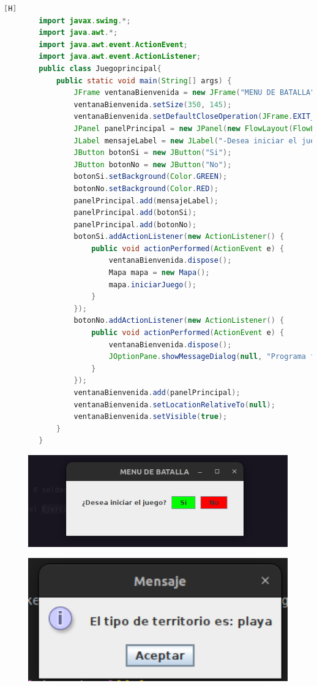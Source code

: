 \documentclass{article}
\begin{document}
	\begin{lstlisting}[language=java,caption={Las lineas de codigos de la clase JuegoPrincipal}][H]
		import javax.swing.*;
		import java.awt.*;
		import java.awt.event.ActionEvent;
		import java.awt.event.ActionListener;
		public class Juegoprincipal{
			public static void main(String[] args) {
				JFrame ventanaBienvenida = new JFrame("MENU DE BATALLA");
				ventanaBienvenida.setSize(350, 145);
				ventanaBienvenida.setDefaultCloseOperation(JFrame.EXIT_ON_CLOSE);
				JPanel panelPrincipal = new JPanel(new FlowLayout(FlowLayout.CENTER, 10, 30));
				JLabel mensajeLabel = new JLabel("-Desea iniciar el juego-");
				JButton botonSi = new JButton("Si");
				JButton botonNo = new JButton("No");
				botonSi.setBackground(Color.GREEN);
				botonNo.setBackground(Color.RED);
				panelPrincipal.add(mensajeLabel);
				panelPrincipal.add(botonSi);
				panelPrincipal.add(botonNo);
				botonSi.addActionListener(new ActionListener() {
					public void actionPerformed(ActionEvent e) {             
						ventanaBienvenida.dispose();
						Mapa mapa = new Mapa();
						mapa.iniciarJuego();
					}
				});
				botonNo.addActionListener(new ActionListener() {              
					public void actionPerformed(ActionEvent e) {
						ventanaBienvenida.dispose();
						JOptionPane.showMessageDialog(null, "Programa finalizado.");
					}
				});
				ventanaBienvenida.add(panelPrincipal);
				ventanaBienvenida.setLocationRelativeTo(null); 
				ventanaBienvenida.setVisible(true);      
			}
		}
	\end{lstlisting}
	\begin{figure}[H]
		\centering
		\includegraphics[width=1.0\textwidth,keepaspectratio]{img/Commit11-1.png}
	\end{figure}
	\begin{figure}[H]
		\centering
		\includegraphics[width=1.0\textwidth,keepaspectratio]{img/Commit11-2.png}
	\end{figure}
\end{document}
